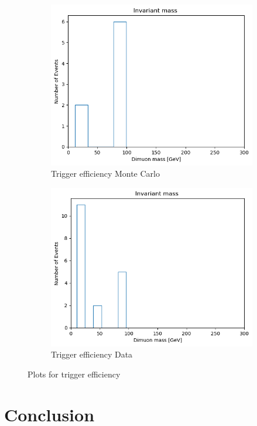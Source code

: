 \documentclass{CUP-JNL-DTM}%
\theoremstyle{definition}
\numberwithin{equation}{section}
\begin{document}
\begin{figure}[H]
    \begin{subfigure}{.5\textwidth}
      \centering
      \includegraphics[width=.8\linewidth]{img/dy_ele_imass.png}
      \caption{Trigger efficiency Monte Carlo}
      \label{fig:sfig1}
    \end{subfigure}%
    \begin{subfigure}{.5\textwidth}
      \centering
      \includegraphics[width=.8\linewidth]{img/dy_muon_imass.png}
      \caption{Trigger efficiency Data}
      \label{fig:sfig2}
    \end{subfigure}
    \caption{Plots for trigger efficiency}
    \label{fig:fig}
\end{figure}

\section{Conclusion}


\begin{Backmatter}
\begin{thebibliography}{}

\end{thebibliography}

\end{Backmatter}
\end{document}
